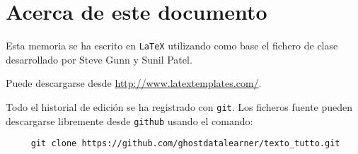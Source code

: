 
\appendix
\renewcommand{\thechapter}{C}
\chapter{Acerca de este documento} %

\label{APP_ABOUT} %

Esta memoria se ha escrito en \texttt{LaTeX} utilizando como base el fichero de clase desarrollado por Steve Gunn y Sunil Patel.

Puede descargarse desde \url{http://www.latextemplates.com/}.

Todo el historial de edición se ha registrado con \texttt{git}. Los ficheros fuente pueden descargarse libremente desde \texttt{github} usando el comando:

\fontsize{3.5mm}{3.5mm}\selectfont
\begin{verbatim}
     git clone https://github.com/ghostdatalearner/texto_tutto.git
\end{verbatim}
\normalsize